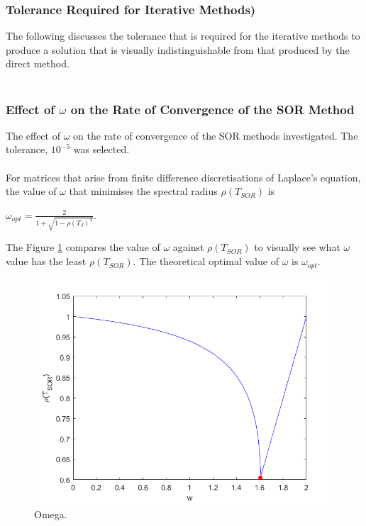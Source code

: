\documentclass[12pt,a4paper]{article}
\begin{document}
\subsubsection{Tolerance Required for Iterative Methods)}
The following discusses the tolerance that is required for the iterative methods to produce a solution that is visually indistinguishable from that produced by the direct method.
\\\\
\subsubsection{Effect of $\omega$ on the Rate of Convergence of the SOR Method}
The effect of $\omega$ on the rate of convergence of the SOR methods investigated. The tolerance, $10^{-5}$ was selected.
\\\\
For matrices that arise from finite difference discretisations of Laplace's equation, the value of $\omega$ that minimises the spectral radius $\rho(T_{SOR})$ is 
\begin{center}
$\omega_{opt} = \frac{2}{1+\sqrt{1-\rho(T_{J})^{2}}}$.
\end{center}
The Figure \ref{fig:omega1} compares the value of $\omega$ against $\rho(T_{SOR})$ to visually see what $\omega$ value has the least $\rho(T_{SOR})$. The theoretical optimal value of $\omega$ is $\omega_{opt}$.

\begin{figure}[H]
	\includegraphics[width=\linewidth]{images/omegaGraph1.png}
	\caption{Omega.}
	\label{fig:omega1}
\end{figure}
\end{document}
